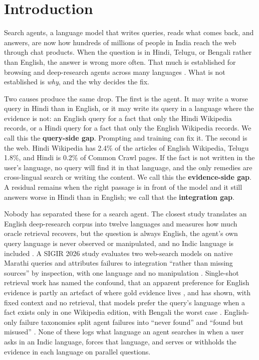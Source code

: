 \section{Introduction}
\label{sec:intro}

Search agents, a language model that writes queries, reads what comes back, and answers, are now how hundreds of millions of people in India reach the web through chat products. When the question is in Hindi, Telugu, or Bengali rather than English, the answer is wrong more often. That much is established for browsing and deep-research agents across many languages \citep{a2505_15935,a2608_08775,a2606_15345,a2610_03574}. What is not established is \emph{why}, and the why decides the fix.

Two causes produce the same drop. The first is the agent. It may write a worse query in Hindi than in English, or it may write its query in a language where the evidence is not: an English query for a fact that only the Hindi Wikipedia records, or a Hindi query for a fact that only the English Wikipedia records. We call this the \textbf{query-side gap}. Prompting and training can fix it. The second is the web. Hindi Wikipedia has 2.4\% of the articles of English Wikipedia, Telugu 1.8\%, and Hindi is 0.2\% of Common Crawl pages. If the fact is not written in the user's language, no query will find it in that language, and the only remedies are cross-lingual search or writing the content. We call this the \textbf{evidence-side gap}. A residual remains when the right passage is in front of the model and it still answers worse in Hindi than in English; we call that the \textbf{integration gap}.

Nobody has separated these for a search agent. The closest study translates an English deep-research corpus into twelve languages and measures how much oracle retrieval recovers, but the question is always English, the agent's own query language is never observed or manipulated, and no Indic language is included \citep{a2606_15345}. A SIGIR 2026 study evaluates two web-search models on native Marathi queries and attributes failures to integration ``rather than missing sources'' by inspection, with one language and no manipulation \citep{kale2026marathiweb}. Single-shot retrieval work has named the confound, that an apparent preference for English evidence is partly an artefact of where gold evidence lives \citep{a2601_02956}, and has shown, with fixed context and no retrieval, that models prefer the query's language when a fact exists only in one Wikipedia edition, with Bengali the worst case \citep{a2610_00606}. English-only failure taxonomies split agent failures into ``never found'' and ``found but misused'' \citep{a2608_01913,a2608_05212}. None of these logs what language an agent searches in when a user asks in an Indic language, forces that language, and serves or withholds the evidence in each language on parallel questions.


